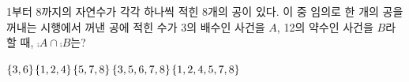 1부터 8까지의 자연수가 각각 하나씩 적힌 8개의 공이 있다. 이 중 임의로 한 개의 공을 꺼내는 시행에서 꺼낸 공에 적힌 수가 3의 배수인 사건을 $A$, 12의 약수인 사건을 $B$라 할 때, $\comp{A}\cap\comp{B}$는?
\begin{choicesii}{$\{3{,}\mkern3mu\mathopen{}6\}$}{$\{1{,}\mkern3mu\mathopen{}2{,}\mkern3mu\mathopen{}4\}$}{$\{5{,}\mkern3mu\mathopen{}7{,}\mkern3mu\mathopen{}8\}$}{$\{3{,}\mkern3mu\mathopen{}5{,}\mkern3mu\mathopen{}6{,}\mkern3mu\mathopen{}7{,}\mkern3mu\mathopen{}8\}$}{$\{1{,}\mkern3mu\mathopen{}2{,}\mkern3mu\mathopen{}4{,}\mkern3mu\mathopen{}5{,}\mkern3mu\mathopen{}7{,}\mkern3mu\mathopen{}8\}$}\end{choicesii}
